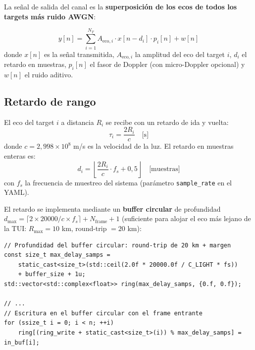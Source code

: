 \documentclass[11pt,a4paper]{article}
\begin{document}
La señal de salida del canal es la \textbf{superposición de los ecos de todos los
targets más ruido AWGN}:

\begin{mathbox}
\begin{equation}
  y[n] = \sum_{i=1}^{N_T} A_{\text{eco},i} \cdot x[n - d_i] \cdot p_i[n] + w[n]
  \label{eq:canal_completo}
\end{equation}
donde $x[n]$ es la señal transmitida, $A_{\text{eco},i}$ la amplitud del eco del
target $i$, $d_i$ el retardo en muestras, $p_i[n]$ el fasor de Doppler (con
micro-Doppler opcional) y $w[n]$ el ruido aditivo.
\end{mathbox}

\subsection{Retardo de rango}

El eco del target $i$ a distancia $R_i$ se recibe con un retardo de ida y vuelta:
\begin{equation}
  \tau_i = \frac{2 R_i}{c} \quad \text{[s]}
\end{equation}
donde $c = 2{,}998 \times 10^8$ m/s es la velocidad de la luz. El retardo en muestras
enteras es:
\begin{equation}
  d_i = \left\lfloor \frac{2 R_i}{c} \cdot f_s + 0{,}5 \right\rfloor \quad \text{[muestras]}
  \label{eq:delay}
\end{equation}
con $f_s$ la frecuencia de muestreo del sistema (parámetro \texttt{sample\_rate} en el YAML).

El retardo se implementa mediante un \textbf{buffer circular} de profundidad
$d_\text{max} = \lceil 2 \times 20000 / c \times f_s \rceil + N_\text{frame} + 1$
(suficiente para alojar el eco más lejano de la TUI: $R_\text{max} = 10$ km,
round-trip $= 20$ km):

\begin{lstlisting}[style=cpp,
  caption={Implementación del buffer circular de retardo — ChannelSimulator.cpp, líneas 68--72 y 113--115}]
// Profundidad del buffer circular: round-trip de 20 km + margen
const size_t max_delay_samps =
    static_cast<size_t>(std::ceil(2.0f * 20000.0f / C_LIGHT * fs))
    + buffer_size + 1u;
std::vector<std::complex<float>> ring(max_delay_samps, {0.f, 0.f});

// ...
// Escritura en el buffer circular con el frame entrante
for (ssize_t i = 0; i < n; ++i)
    ring[(ring_write + static_cast<size_t>(i)) % max_delay_samps] = in_buf[i];
\end{lstlisting}
\end{document}
